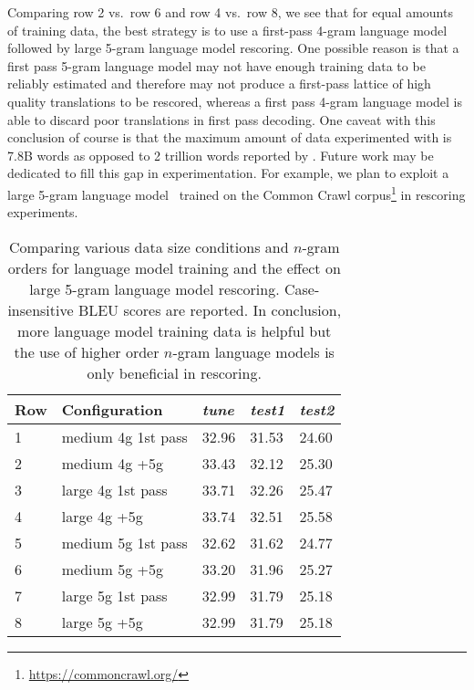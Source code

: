 Comparing row 2 vs.\ row 6 and row 4 vs.\ row 8, we see
that for equal amounts of training data, the best strategy
is to use a first-pass 4-gram language model followed by
large 5-gram language model rescoring. One possible reason
is that a first pass 5-gram language model may not have enough training
data to be reliably estimated and therefore may not
produce a first-pass lattice of high quality translations to be rescored, whereas
a first pass 4-gram language model is able to discard poor translations in first pass
decoding.
One caveat with this
conclusion of course is that the maximum amount of data experimented
with is 7.8B words as opposed to 2 trillion words reported
by \citet{brants-popat-xu-och-dean:2007:EMNLP-CoNLL}. Future work may be dedicated to fill this gap in experimentation.
For example, we plan to exploit a large 5-gram language model~\citep{buck-heafield-vanooyen:2014:LREC}
trained on the Common Crawl corpus\footnote{\url{https://commoncrawl.org/}}
in rescoring experiments.
%
\begin{table}
  \begin{center}
    \begin{tabular}{l|l|lll}
      Row & Configuration & \emph{tune} & \emph{test1} & \emph{test2} \\
      \hline
      1 & medium 4g 1st pass & 32.96 & 31.53 & 24.60 \\
      2 & medium 4g +5g &       33.43 & 32.12 & 25.30 \\
      \hline
      3 & large 4g 1st pass  & 33.71 & 32.26 & 25.47 \\
      4 & large 4g +5g       & 33.74 & 32.51 & 25.58 \\
      \hline
      5 & medium 5g 1st pass & 32.62 & 31.62 & 24.77 \\
      6 & medium 5g +5g       & 33.20 & 31.96 & 25.27 \\
      \hline
      7 & large 5g 1st pass  & 32.99 & 31.79 & 25.18 \\
      8 & large 5g +5g       & 32.99 & 31.79 & 25.18 \\
    \end{tabular}
    \caption{Comparing various data size conditions and $n$-gram orders
      for language model training and the effect on large 5-gram language
      model rescoring. Case-insensitive BLEU scores are reported.
      In conclusion, more language
      model training data is helpful but the use of higher order $n$-gram language
      models is only beneficial in rescoring.}
    \label{tab:lmSizes}
  \end{center}
\end{table}

